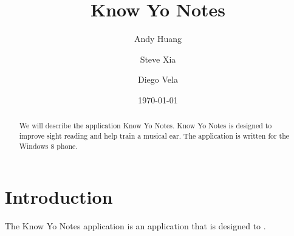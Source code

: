 \documentclass[11pt]{amsart}
\title[Know Yo Notes]{Know Yo Notes}
\author{Andy Huang}
\author{Steve Xia}
\author{Diego Vela}
\theoremstyle{definition}
\numberwithin{equation}{section}
\numberwithin{figure}{section}
\numberwithin{subfigure}{section}
\numberwithin{figure}{section}
\begin{document}
\date{\today}

\begin{abstract}
We will describe the application Know Yo Notes.  Know Yo Notes is designed to improve sight reading and help train a musical ear.  The application is written for the Windows 8 phone.
\end{abstract}


\maketitle

\section{Introduction}\label{sec:intro}
The Know Yo Notes application is an application that is designed to .
\end{document}
